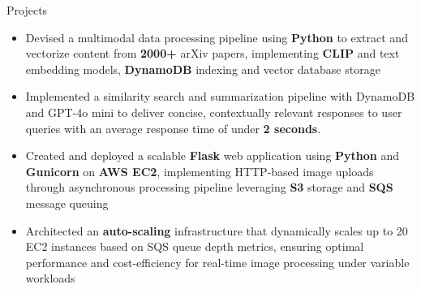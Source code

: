 \documentclass{resume}
\begin{document}
\begin{experienceSection}{Projects}

    \projectItem[
        title=RAG Implementation for arXiv Papers,
        duration={Nov 2024},
    ]
    \begin{itemize}
        \vspace{-0.5em}
        \itemsep -6pt {}
        \item Devised a multimodal data processing pipeline using \textbf{Python} to extract and vectorize content from \textbf{2000+} arXiv papers, implementing \textbf{CLIP} and text embedding models, \textbf{DynamoDB} indexing and vector database storage
        \item Implemented a similarity search and summarization pipeline with DynamoDB and GPT-4o mini to deliver concise, contextually relevant responses to user queries with an average response time of under \textbf{2 seconds}.
    \end{itemize}

    \projectItem[
        title=AWS-Based Face Recognition App,
        duration={May 2024},
    ]
    \begin{itemize}
        \vspace{-0.5em}
        \itemsep -6pt {}
        \item Created and deployed a scalable \textbf{Flask} web application using \textbf{Python} and \textbf{Gunicorn} on\textbf{ AWS EC2}, implementing HTTP-based image uploads through asynchronous processing pipeline leveraging \textbf{S3} storage and \textbf{SQS} message queuing
        \item Architected an \textbf{auto-scaling} infrastructure that dynamically scales up to 20 EC2 instances based on SQS queue depth metrics, ensuring optimal performance and cost-efficiency for real-time image processing under variable workloads
    \end{itemize}
    
\end{experienceSection}
\end{document}
